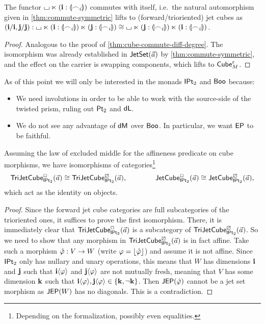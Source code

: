 \documentclass[a4paper]{memoir}
\begin{document}
\begin{proposition} \label{thm:cube-commute-symmetric}
	The functor ${\llcorner\hspace{-.4ex}\lrcorner} \ltimes (\mathbf{i} : {\llparenthesis \frown_i \rrparenthesis})$ commutes with itself, i.e.\ the natural automorphism given in \cref{thm:commute-symmetric} lifts to (forward/trioriented) jet cubes as $(\mathbf{i} / \mathbf{i}, \mathbf{j} / \mathbf{j}) : {\llcorner\hspace{-.4ex}\lrcorner} \ltimes (\mathbf{i} : {\llparenthesis \frown_i \rrparenthesis}) \ltimes (\mathbf{j} : {\llparenthesis \frown_i \rrparenthesis}) \cong {\llcorner\hspace{-.4ex}\lrcorner} \ltimes (\mathbf{j} : {\llparenthesis \frown_i \rrparenthesis}) \ltimes (\mathbf{i} : {\llparenthesis \frown_i \rrparenthesis})$.
\end{proposition}
\begin{proof}
	Analogous to the proof of \cref{thm:cube-commute-diff-degree}.
	The isomorphism was already established in $\mathsf{JetSet}(\vec a)$ by \cref{thm:commute-symmetric}, and the effect on the carrier is swapping components, which lifts to ${\mathsf{Cube}}_M^\varepsilon$.
\end{proof}
\begin{remark} \label{rem:two-monads}
	As of this point we will only be interested in the monads ${\mathsf{IPt}_2}$ and $\mathsf{Boo}$ because:
	\begin{itemize}
		\item We need involutions in order to be able to work with the source-side of the twisted prism, ruling out ${\mathsf{Pt}_2}$ and $\mathsf{dL}$.
		\item We do not see any advantage of $\mathsf{dM}$ over $\mathsf{Boo}$. In particular, we want $\mathsf{EP}$ to be faithful.
	\end{itemize}
\end{remark}
\begin{theorem} \label{thm:affine-automatic}
	Assuming the law of excluded middle for the affineness predicate on cube morphisms, we have isomorphisms of categories\footnote{Depending on the formalization, possibly even equalities.}
	\[
		\mathsf{TriJetCube}^{\Box}_{{\mathsf{IPt}_2}}\mathopen{}\left( \vec a \right)\mathclose{} \cong \mathsf{TriJetCube}^{\boxslash}_{{\mathsf{IPt}_2}}\mathopen{}\left( \vec a \right)\mathclose{},
		\qquad \qquad
		\mathsf{JetCube}^{\Box}_{{\mathsf{IPt}_2}}\mathopen{}\left( \vec a \right)\mathclose{} \cong \mathsf{JetCube}^{\boxslash}_{{\mathsf{IPt}_2}}\mathopen{}\left( \vec a \right)\mathclose{},
	\]
	which act as the identity on objects.
\end{theorem}
\begin{proof}
	Since the forward jet cube categories are full subcategories of the trioriented ones, it suffices to prove the first isomorphism.
	There, it is immediately clear that $\mathsf{TriJetCube}^{\Box}_{{\mathsf{IPt}_2}}\mathopen{}\left( \vec a \right)\mathclose{}$ is a subcategory of $\mathsf{TriJetCube}^{\boxslash}_{{\mathsf{IPt}_2}}\mathopen{}\left( \vec a \right)\mathclose{}$.
	So we need to show that any morphism in $\mathsf{TriJetCube}^{\boxslash}_{{\mathsf{IPt}_2}}\mathopen{}\left( \vec a \right)\mathclose{}$ is in fact affine.
	Take such a morphism $\hat {\varphi} : V \to W$ (write $\varphi = \mathopen{}\left\lfloor \hat {\varphi} \right\rfloor\mathclose{}$) and assume it is not affine.
	Since ${\mathsf{IPt}_2}$ only has nullary and unary operations, this means that $W$ has dimensions $\mathbf{i}$ and $\mathbf{j}$ such that $\mathbf{i} \langle \varphi \rangle$ and $\mathbf{j} \langle \varphi \rangle$ are not mutually fresh, meaning that $V$ has some dimension $\mathbf{k}$ such that $\mathbf{i} \langle \varphi \rangle, \mathbf{j} \langle \varphi \rangle \in \mathopen{}\left\{ \mathbf{k}, \lnot \mathbf{k} \right\}\mathclose{}$.
	Then $\mathsf{JEP}(\hat {\varphi})$ cannot be a jet set morphism as $\mathsf{JEP}(W)$ has no diagonals. This is a contradiction.
\end{proof}
\end{document}
